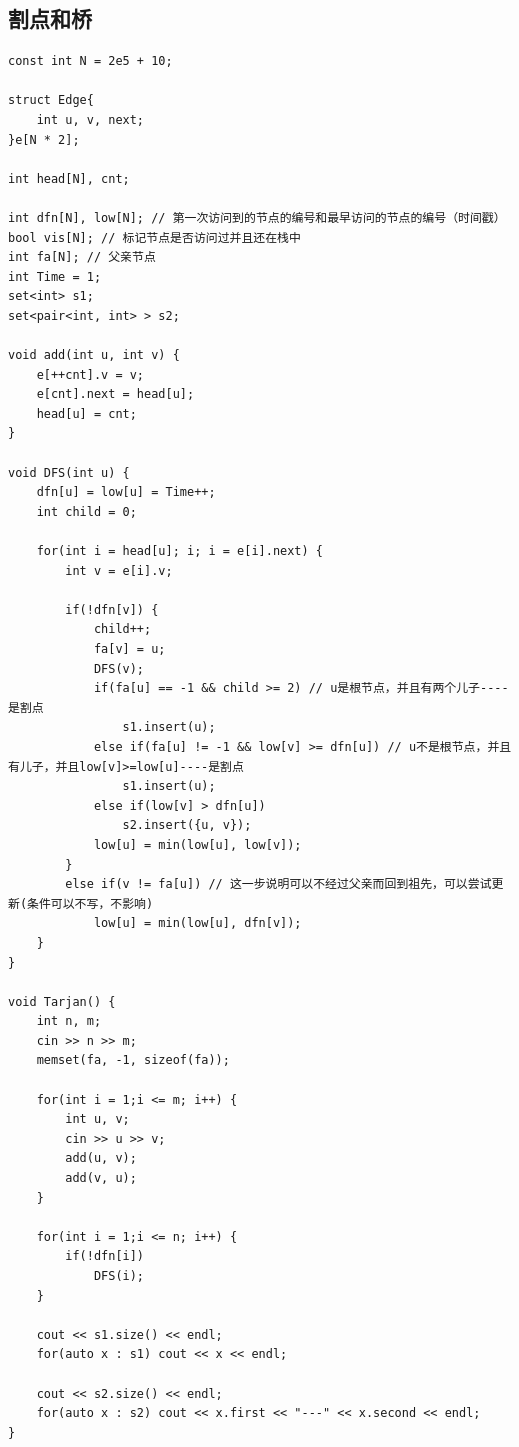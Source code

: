 \documentclass[twoside]{article}
\begin{document}
\subsection{割点和桥}
\begin{lstlisting}
const int N = 2e5 + 10;

struct Edge{
    int u, v, next;
}e[N * 2];

int head[N], cnt;

int dfn[N], low[N]; // 第一次访问到的节点的编号和最早访问的节点的编号（时间戳）
bool vis[N]; // 标记节点是否访问过并且还在栈中
int fa[N]; // 父亲节点
int Time = 1;
set<int> s1;
set<pair<int, int> > s2;

void add(int u, int v) {
    e[++cnt].v = v;
    e[cnt].next = head[u];
    head[u] = cnt;
}

void DFS(int u) {
    dfn[u] = low[u] = Time++;
    int child = 0;

    for(int i = head[u]; i; i = e[i].next) {
        int v = e[i].v;

        if(!dfn[v]) {
            child++;
            fa[v] = u;
            DFS(v);
            if(fa[u] == -1 && child >= 2) // u是根节点，并且有两个儿子----是割点
                s1.insert(u);
            else if(fa[u] != -1 && low[v] >= dfn[u]) // u不是根节点，并且有儿子，并且low[v]>=low[u]----是割点
                s1.insert(u);
            else if(low[v] > dfn[u])
                s2.insert({u, v});
            low[u] = min(low[u], low[v]);
        }
        else if(v != fa[u]) // 这一步说明可以不经过父亲而回到祖先，可以尝试更新(条件可以不写，不影响)
            low[u] = min(low[u], dfn[v]);
    }
}

void Tarjan() {
    int n, m;
    cin >> n >> m;
    memset(fa, -1, sizeof(fa));

    for(int i = 1;i <= m; i++) {
        int u, v;
        cin >> u >> v;
        add(u, v);
        add(v, u);
    }
    
    for(int i = 1;i <= n; i++) {
        if(!dfn[i])
            DFS(i);
    }

    cout << s1.size() << endl;
    for(auto x : s1) cout << x << endl;

    cout << s2.size() << endl;
    for(auto x : s2) cout << x.first << "---" << x.second << endl;
}

\end{lstlisting}
\end{document}
